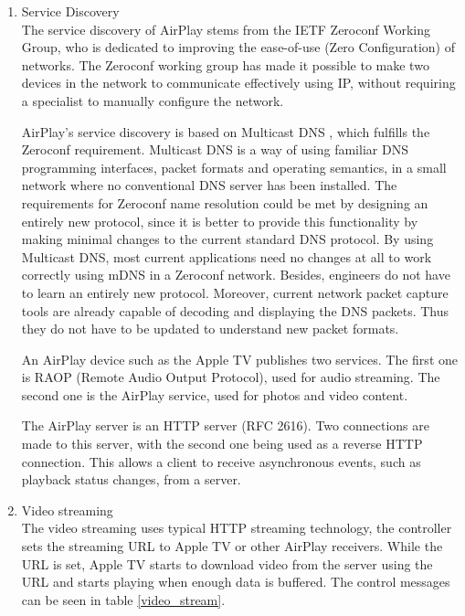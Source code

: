 \begin{enumerate} 
\item Service Discovery \\ 
The service discovery of AirPlay stems from the IETF Zeroconf Working Group, 
who is dedicated to improving the ease-of-use (Zero Configuration) of networks. The 
Zeroconf working group has made it possible to make two devices in the 
network to communicate effectively using IP, without requiring a specialist to manually 
configure the network. 

AirPlay's service discovery is based on Multicast DNS \cite{multicastdns}, which 
fulfills the Zeroconf requirement. Multicast DNS is a way of using familiar DNS 
programming interfaces, packet formats and operating semantics, in a small 
network where no conventional DNS server has been installed. The requirements 
for Zeroconf name resolution could be met by designing an entirely new 
protocol, since it is better to provide this functionality by making minimal changes 
to the current standard DNS protocol. By using Multicast DNS, most current 
applications need no changes at all to work correctly using mDNS in a Zeroconf network. Besides,
engineers do not have to learn an entirely new protocol. Moreover, current network 
packet capture tools are already capable of  decoding and displaying the DNS packets. Thus they do not 
have to be updated to understand new packet formats. 

An AirPlay device such as the Apple TV publishes two services. The first one is 
RAOP (Remote Audio Output Protocol), used for audio streaming. The second 
one is the AirPlay service, used for photos and video content. 

The AirPlay server is an HTTP server (RFC 2616). Two connections are made to this 
server, with the second one being used as a reverse HTTP connection. This allows a 
client to receive asynchronous events, such as playback status changes, from a 
server. 
\item Video streaming \\ 
The video streaming uses typical HTTP streaming technology, the controller sets 
the streaming URL to Apple TV or other AirPlay receivers. While the URL is set, 
Apple TV starts to download video from the server using the URL and starts 
playing when enough data is buffered. The control messages can be seen in 
table \ref{video_stream}. 


\end{enumerate}
